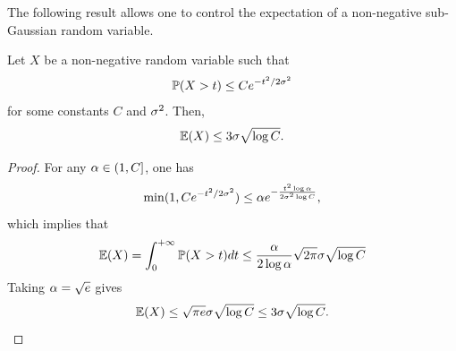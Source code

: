 The following result allows one to control the expectation of a non-negative sub-Gaussian random variable. 
\begin{proposition}
\label{prop:subg.exp}
Let $X$ be a non-negative random variable such that 
\[
\bm{\mathbb P}(X>t) \leq Ce^{-t^2/2\sigma^2}
\]
for some constants $C$ and $\sigma^2$. Then, 
\[
\bm{\mathbb E}(X) \leq 3 \sigma \sqrt{\log C}.
\]
\end{proposition}
\begin{proof}
For any $\alpha\in (1, C]$, one has
\[
\min(1,  Ce^{-t^2/2\sigma^2}) \leq \alpha e^{-\frac{t^2\log\alpha}{2\sigma^2\log C}},
\]
which implies that 
\[
\bm{\mathbb E}(X) = \int_0^{+\infty} \bm{\mathbb P}(X>t) dt \leq \frac{\alpha}{2\log\alpha} \sqrt{2\pi} \sigma \sqrt{\log C}
\]
Taking $\alpha = \sqrt{e}$ gives
\[
\bm{\mathbb E}(X) \leq \sqrt{\pi e} \sigma \sqrt{\log C} \leq 3 \sigma \sqrt{\log C}.
\]
\end{proof}


